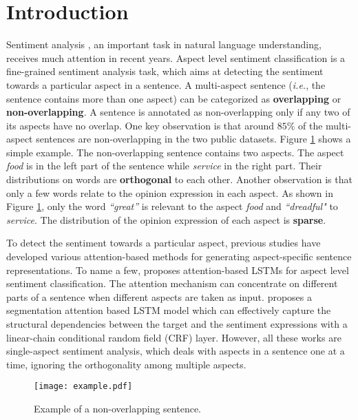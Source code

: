 \section{Introduction}
Sentiment analysis \cite{Nasukawa2003Sentiment,liu2012sentiment}, an important task in natural language understanding, receives much attention in recent years. Aspect level sentiment classification is a fine-grained sentiment analysis task, which aims at detecting the sentiment towards a particular aspect in a sentence. A multi-aspect sentence (\emph{i.e.}, the sentence contains more than one aspect) can be categorized as {\bf overlapping} or {\bf non-overlapping}. A sentence is annotated as non-overlapping only if any two of its aspects have no overlap. One key observation is that around $85\%$ of the multi-aspect sentences are non-overlapping in the two public datasets. Figure \ref{sentence} shows a simple example. The non-overlapping sentence contains two aspects. The aspect \emph{food} is in the left part of the sentence while \emph{service} in the right part. Their distributions on words are {\bf orthogonal} to each other. Another observation is that only a few words relate to the opinion expression in each aspect. As shown in Figure \ref{sentence}, only the word \emph{``great''} is relevant to the aspect \emph{food} and \emph{``dreadful"} to \emph{service}. The distribution of the opinion expression of each aspect is {\bf sparse}. 

To detect the sentiment towards a particular aspect, previous studies \cite{Wang2016Attention,Ma2017Interactive,cheng2017aspect,ma2018targeted,huang2018aspect,wang2018learning} have developed various attention-based methods for generating aspect-specific sentence representations. To name a few, \cite{Wang2016Attention} proposes attention-based LSTMs for aspect level sentiment classification. The attention mechanism can concentrate on different parts of a sentence when different aspects are taken as input. %
\cite{wang2018learning} proposes a segmentation attention based LSTM model which can effectively capture the structural dependencies between the target and the sentiment expressions with a linear-chain conditional random field (CRF) layer. However, all these works are single-aspect sentiment analysis, which deals with aspects in a sentence one at a time, ignoring the orthogonality among multiple aspects. 

\begin{figure}
\setlength{\abovecaptionskip}{0.2cm}    %
\setlength{\belowcaptionskip}{-0.2cm}   %
\centering
\texttt{[image: example.pdf]}
\caption{Example of a non-overlapping sentence.} 
  \label{sentence} 
\end{figure}

